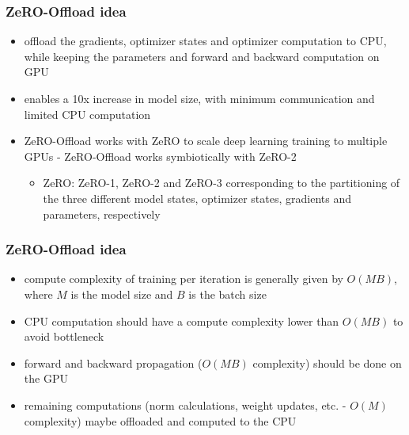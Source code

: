 \documentclass{beamer}
\begin{document}
\begin{frame}
    \frametitle{ZeRO-Offload idea}
    \begin{itemize}
        \item offload the gradients, optimizer states and optimizer computation to CPU, while keeping the parameters and forward and backward computation on GPU
        \item enables a 10x increase in model size, with minimum communication and limited CPU computation
        \item ZeRO-Offload works with ZeRO to scale deep learning training to multiple GPUs - ZeRO-Offload works symbiotically with ZeRO-2
        \begin{itemize}
        	\item \footnotesize{ZeRO: ZeRO-1, ZeRO-2 and ZeRO-3 corresponding to the partitioning of the three different model states, optimizer states, gradients and parameters, respectively}
        \end{itemize}
    \end{itemize}
\end{frame}

\begin{frame}
    \frametitle{ZeRO-Offload idea}
    \begin{itemize}
        \item compute complexity of training per iteration is
generally given by $O(MB)$, where $M$ is the model size and $B$
is the batch size
        \item CPU computation should have a compute complexity lower than $O(MB)$ to avoid bottleneck
        \item forward and backward propagation ($O(MB)$ complexity) should be done on the GPU
        \item remaining computations (norm calculations, weight updates, etc. - $O(M)$ complexity) maybe offloaded and computed to the CPU
    \end{itemize}
\end{frame}
\end{document}
